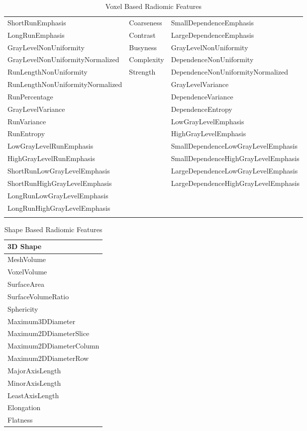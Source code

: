 \begin{longtable}[H]{|l|l|l|}
ShortRunEmphasis & Coarseness & SmallDependenceEmphasis \\ \nobreakhline
LongRunEmphasis & Contrast & LargeDependenceEmphasis \\ \nobreakhline
GrayLevelNonUniformity & Busyness & GrayLevelNonUniformity \\ \nobreakhline
GrayLevelNonUniformityNormalized & Complexity & DependenceNonUniformity \\ \nobreakhline
RunLengthNonUniformity & Strength & DependenceNonUniformityNormalized \\ \nobreakhline
RunLengthNonUniformityNormalized &  & GrayLevelVariance \\ \nobreakhline
RunPercentage &  & DependenceVariance \\ \nobreakhline
GrayLevelVariance &  & DependenceEntropy \\ \nobreakhline
RunVariance &  & LowGrayLevelEmphasis \\ \nobreakhline
RunEntropy &  & HighGrayLevelEmphasis \\ \nobreakhline
LowGrayLevelRunEmphasis &  & SmallDependenceLowGrayLevelEmphasis \\ \nobreakhline
HighGrayLevelRunEmphasis &  & SmallDependenceHighGrayLevelEmphasis \\ \nobreakhline
ShortRunLowGrayLevelEmphasis &  & LargeDependenceLowGrayLevelEmphasis \\ \nobreakhline
ShortRunHighGrayLevelEmphasis &  & LargeDependenceHighGrayLevelEmphasis \\ \nobreakhline
LongRunLowGrayLevelEmphasis &  &  \\ \nobreakhline
LongRunHighGrayLevelEmphasis &  &  \\ \nobreakhline
\caption{Voxel Based Radiomic Features}
\label{tab:radf1}
\end{longtable}
\egroup

\begin{table}[H]
\centering
\begin{tabular}{|l|}
\hline
\textbf{3D Shape} \\ \hline
MeshVolume \\ \hline
VoxelVolume \\ \hline
SurfaceArea \\ \hline
SurfaceVolumeRatio \\ \hline
Sphericity \\ \hline
Maximum3DDiameter \\ \hline
Maximum2DDiameterSlice \\ \hline
Maximum2DDiameterColumn \\ \hline
Maximum2DDiameterRow \\ \hline
MajorAxisLength \\ \hline
MinorAxisLength \\ \hline
LeastAxisLength \\ \hline
Elongation \\ \hline
Flatness \\ \hline
\end{tabular}
\caption{Shape Based Radiomic Features}
\label{tab:radf2}
\end{table}

